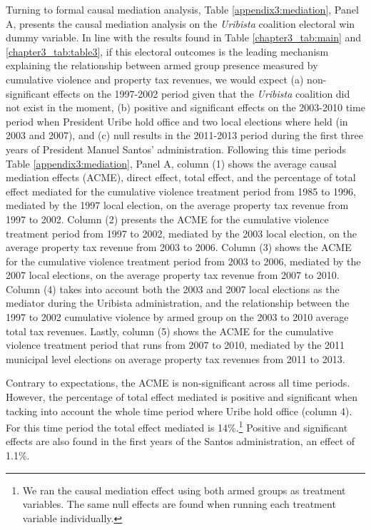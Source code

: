 Turning to formal causal mediation analysis, Table \ref{appendix3:mediation}, Panel A, presents the causal mediation analysis on the \emph{Uribista} coalition electoral win dummy variable. In line with the results found in Table \ref{chapter3_tab:main} and \ref{chapter3_tab:table3}, if this electoral outcomes is the leading mechanism explaining the relationship between armed group presence measured by cumulative violence and property tax revenues, we would expect (a) non-significant effects on the 1997-2002 period given that the \emph{Uribista} coalition did not exist in the moment, (b) positive and significant effects on the 2003-2010 time period when President Uribe hold office and two local elections where held (in 2003 and 2007), and (c) null results in the 2011-2013 period during the first three years of President Manuel Santos' administration. Following this time periods Table \ref{appendix3:mediation}, Panel A, column (1) shows the average causal mediation effects (ACME), direct effect, total effect, and the percentage of total effect mediated for the cumulative violence treatment period from 1985 to 1996, mediated by the 1997 local election, on the average property tax revenue from 1997 to 2002. Column (2) presents the ACME for the cumulative violence treatment period from 1997 to 2002, mediated by the 2003 local election, on the average property tax revenue from 2003 to 2006. Column (3) shows the ACME for the cumulative violence treatment period from 2003 to 2006, mediated by the 2007 local elections, on the average property tax revenue from 2007 to 2010. Column (4) takes into account both the 2003 and 2007 local elections as the mediator during the Uribista administration, and the relationship between the 1997 to 2002 cumulative violence by armed group on the 2003 to 2010 average total tax revenues. Lastly, column (5) shows the ACME for the cumulative violence treatment period that runs from 2007 to 2010, mediated by the 2011 municipal level elections on average property tax revenues from 2011 to 2013. 

Contrary to expectations, the ACME is non-significant across all time periods. However, the percentage of total effect mediated is positive and significant when tacking into account the whole time period where Uribe hold office (column 4). For this time period the total effect mediated is 14\%.\footnote{We ran the causal mediation effect using both armed groups as treatment variables. The same null effects are found when running each treatment variable individually.} Positive and significant effects are also found in the first years of the Santos administration, an effect of 1.1\%. 

